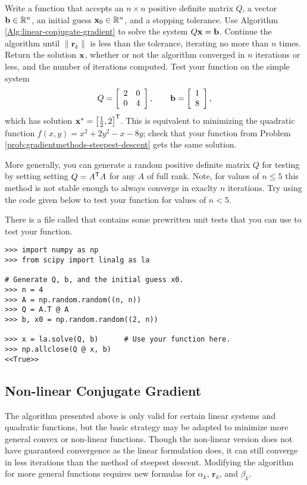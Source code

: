 \begin{problem} %
Write a function that accepts an $n \times n$ positive definite matrix $Q$, a vector $\mathbf{b}\in\mathbb{R}^n$, an initial guess $\mathbf{x}_0\in\mathbb{R}^n$, and a stopping tolerance.
Use Algorithm \ref{Alg:linear-conjugate-gradient} to solve the system $Q\mathbf{x} = \mathbf{b}$.
Continue the algorithm until $\|\mathbf{r}_k\|$ is less than the tolerance, iterating no more than $n$ times.
Return the solution $\mathbf{x}$, whether or not the algorithm converged in $n$ iterations or less, and the number of iterations computed.
Test your function on the simple system
\[
Q = \left[\begin{array}{cc}2 & 0 \\ 0 & 4\end{array}\right],
\qquad
\mathbf{b} = \left[\begin{array}{c}1 \\ 8\end{array}\right],
\]
which has solution $\mathbf{x}^* = \left[\frac{1}{2}, 2\right]^{\mathsf T}$.
This is equivalent to minimizing the quadratic function $f(x,y) = x^2 + 2y^2 - x - 8y$; check that your function from Problem \ref{prob:gradientmethods-steepest-descent} gets the same solution.

More generally, you can generate a random positive definite matrix $Q$ for testing by setting setting $Q = A^{\mathsf T} A$ for any $A$ of full rank.
Note, for values of ${n \leq 5}$ this method is not stable enough to always converge in exaclty $n$ iterations.
Try using the code given below to test your function for values of ${n < 5}$.

There is a file called  that contains some prewritten unit tests that you can use to test your function.

\begin{lstlisting}
>>> import numpy as np
>>> from scipy import linalg as la

# Generate Q, b, and the initial guess x0.
>>> n = 4
>>> A = np.random.random((n, n))
>>> Q = A.T @ A
>>> b, x0 = np.random.random((2, n))

>>> x = la.solve(Q, b)      # Use your function here.
>>> np.allclose(Q @ x, b)
<<True>>
\end{lstlisting}
\label{prob:gradientmethods-linear-cg}
\end{problem}

\subsection*{Non-linear Conjugate Gradient}
The algorithm presented above is only valid for certain linear systems and quadratic functions, but the basic strategy may be adapted to minimize more general convex or non-linear functions.
Though the non-linear version does not have guaranteed convergence as the linear formulation does, it can still converge in less iterations than the method of steepest descent.
Modifying the algorithm for more general functions requires new formulas for $\alpha_k$, $\mathbf{r}_k$, and $\beta_k$.

